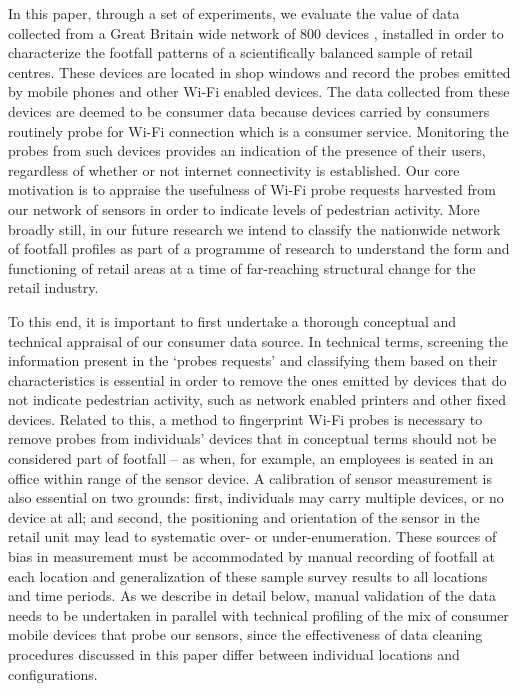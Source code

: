In this paper, through a set of experiments, we evaluate the value of data collected from a Great Britain wide network of 800 devices \citep{sss2016}, installed in order to characterize the footfall patterns of a scientifically balanced sample of retail centres.
These devices are located in shop windows and record the probes emitted by mobile phones and other Wi-Fi enabled devices.
The data collected from these devices are deemed to be consumer data because devices carried by consumers routinely probe for Wi-Fi connection which is a consumer service.
Monitoring the probes from such devices provides an indication of the presence of their users, regardless of whether or not internet connectivity is established.
Our core motivation is to appraise the usefulness of Wi-Fi probe requests harvested from our network of sensors in order to indicate levels of pedestrian activity.
More broadly still, in our future research we intend to classify the nationwide network of footfall profiles as part of a programme of research to understand the form and functioning of retail areas at a time of far-reaching structural change for the retail industry.

To this end, it is important to first undertake a thorough conceptual and technical appraisal of our consumer data source.
In technical terms, screening the information present in the `probes requests' and classifying them based on their characteristics is essential in order to remove the ones emitted by devices that do not indicate pedestrian activity, such as network enabled printers and other fixed devices.
Related to this, a method to fingerprint Wi-Fi probes is necessary to remove probes from individuals’ devices that in conceptual terms should not be considered part of footfall – as when, for example, an employees is seated in an office within range of the sensor device.
A calibration of sensor measurement is also essential on two grounds: first, individuals may carry multiple devices, or no device at all; and second, the positioning and orientation of the sensor in the retail unit may lead to systematic over- or under-enumeration.
These sources of bias in measurement must be accommodated by manual recording of footfall at each location and generalization of these sample survey results to all locations and time periods.
As we describe in detail below, manual validation of the data needs to be undertaken in parallel with technical profiling of the mix of consumer mobile devices that probe our sensors, since the effectiveness of data cleaning procedures discussed in this paper differ between individual locations and configurations.

